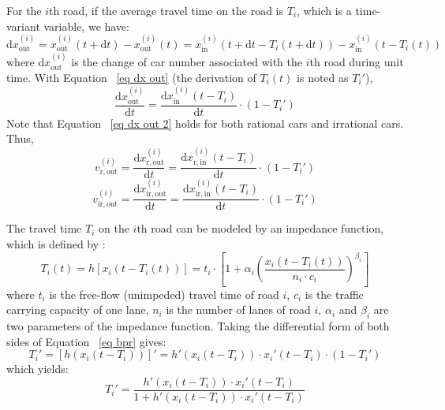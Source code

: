\documentclass[review,11pt,nonatbib]{elsarticle}
\begin{document}
\par For the $i$th road, if the average travel time on the road is $T_i$, which is a time-variant variable, we have:
\begin{equation}\label{eq dx out}
\mathrm{d}x_{\mathrm{out}}^{(i)} = x_{\mathrm{out}}^{(i)}(t+\mathrm{d}t)- x_{\mathrm{out}}^{(i)}(t) =
                               x_{\mathrm{in}}^{(i)}(t+\mathrm{d}t-T_i(t+\mathrm{d}t)) - x_{\mathrm{in}}^{(i)}(t - T_i(t))
\end{equation}
where $\mathrm{d}x_{\mathrm{out}}^{(i)}$ is the change of car number associated with the $i$th road during unit time. With Equation ~\eqref{eq dx out} (the derivation of $T_i(t)$ is noted as $T_i'$),
\begin{equation}\label{eq dx out 2}
\frac{\mathrm{d}x_{\mathrm{out}}^{(i)}}{\mathrm{d}t} = \frac{\mathrm{d}x_{\mathrm{in}}^{(i)}(t-T_i)}{\mathrm{d}t}\cdot\left(1-T_i'\right)
\end{equation}
Note that Equation ~\eqref{eq dx out 2} holds for both rational cars and irrational cars. Thus,
\begin{equation}\label{eq vr out}
v_{\mathrm{r,out}}^{(i)} =
\frac{\mathrm{d}x_{\mathrm{r,out}}^{(i)}}{\mathrm{d}t} = \frac{\mathrm{d}x_{\mathrm{r,in}}^{(i)}(t-T_i)}{\mathrm{d}t}\cdot\left(1-T_i'\right)
\end{equation}
\begin{equation}\label{eq vir out}
v_{\mathrm{ir,out}}^{(i)} =
\frac{\mathrm{d}x_{\mathrm{ir,out}}^{(i)}}{\mathrm{d}t} = \frac{\mathrm{d}x_{\mathrm{ir,in}}^{(i)}(t-T_i)}{\mathrm{d}t}\cdot\left(1-T_i'\right)
\end{equation}
\par The travel time $T_i$ on the $i$th road can be modeled by an impedance function, which is defined by \citep{Branston1976Link}:
\begin{equation}\label{eq bpr}
T_i(t)=h[x_i(t-T_i(t))]=t_i\cdot\left[1+\alpha_i\left(\frac{x_i(t-T_i(t))}{n_i\cdot c_i}\right)^{\beta_i}\right]
\end{equation}
where $t_i$ is the free-flow (unimpeded) travel time of road $i$, $c_i$ is the traffic carrying capacity of one lane, $n_i$ is the number of lanes of road $i$, $\alpha_i$ and $\beta_i$ are two parameters of the impedance function. Taking the differential form of both sides of Equation ~\eqref{eq bpr} gives:
\begin{equation}
T_i'=[h(x_i(t-T_i))]' = h'(x_i(t-T_i))\cdot x_i'(t-T_i)\cdot (1-T_i')
\end{equation}
which yields:
\begin{equation}\label{eq Ti diff}
T_i'=\frac{h'(x_i(t-T_i))\cdot x_i'(t-T_i)}{1+h'(x_i(t-T_i))\cdot x_i'(t-T_i)}
\end{equation}
\end{document}
